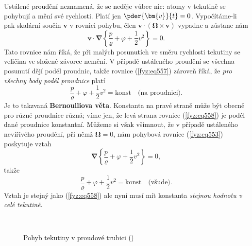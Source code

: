     Ustálené proudění neznamená, že se neděje vůbec nic: atomy v tekutině se pohybují a mění
    své rychlosti. Platí jen \(\pder{\bm{v}}{t} = 0\). Vypočítáme-li pak skalární součin \(\bm{v}\) 
    v rovnici pohybu, člen \(\bm{v}\cdot(\symbf{\Omega}\times\bm{v})\)  vypadne a zůstane nám
    \begin{equation}\label{fyz:eq557}
      \bm{v}\cdot\symbf{\nabla}\left\lbrace\dfrac{p}{\varrho}
      + \varphi + \dfrac{1}{2}v^2\right\rbrace = 0.
    \end{equation}
    Tato rovnice nám říká, že při malých posunutích ve směru rychlosti tekutiny se veličina ve 
    složené závorce nemění. V případě ustáleného proudění se všechna posunutí dějí podél proudnic, 
    takže rovnice (\ref{fyz:eq557}) zároveň říká, že \emph{pro všechny body podél proudnice} platí
    \begin{equation}\label{fyz:eq558}
      \dfrac{p}{\varrho}+\varphi+\dfrac{1}{2}v^2 = \text{konst} \quad \text{(na proudnici)}.
    \end{equation}
    Je to takzvaná \textbf{Bernoulliova věta}. Konstanta na pravé straně může být obecně pro různé 
    proudnice různá; víme jen, že levá strana rovnice (\ref{fyz:eq558}) je podél dané proudnice 
    konstantní. Můžeme si však všimnout, že v případě ustáleného nevířivého proudění, při němž 
    \(\symbf{\Omega} =0\), nám pohybová rovnice (\ref{fyz:eq553}) poskytuje vztah
    \begin{equation}\label{fyz:eq559}
      \symbf{\nabla}\left\lbrace\dfrac{p}{\varrho}+\varphi+\dfrac{1}{2}v^2\right\rbrace = 0,
    \end{equation}
    takže
    \begin{equation}\label{fyz:eq560}
      \dfrac{p}{\varrho}+\varphi+\dfrac{1}{2}v^2 = \text{konst} \quad \text{(všude)}.
    \end{equation}
    Vztah je stejný jako (\ref{fyz:eq558}) ale nyní musí mít konstanta \emph{stejnou hodnotu v celé 
    tekutině}.

    \begin{figure}[ht!]
      \centering
                     \\
      \caption{Pohyb tekutiny v proudové trubici
               (\cite[s.~748]{Feynman02})}
      \label{fyz:fig549}
    \end{figure}
    
